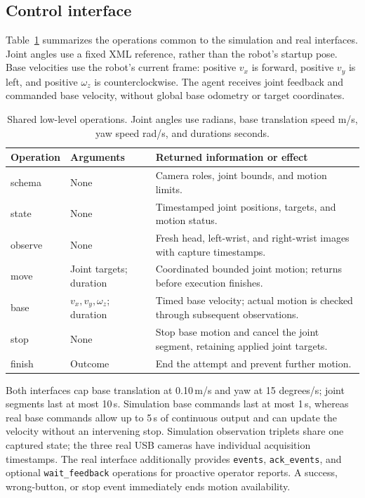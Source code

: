 \documentclass[11pt]{article}
\begin{document}
\subsection{Control interface}
Table~\ref{tab:api} summarizes the operations common to the simulation and real interfaces. Joint angles use a fixed XML reference, rather than the robot's startup pose. Base velocities use the robot's current frame: positive $v_x$ is forward, positive $v_y$ is left, and positive $\omega_z$ is counterclockwise. The agent receives joint feedback and commanded base velocity, without global base odometry or target coordinates.

\begin{table}[H]\centering\small
\begin{tabular}{@{}>{\ttfamily}p{1.6cm}>{\raggedright\arraybackslash}p{3.6cm}>{\raggedright\arraybackslash}p{9.0cm}@{}}
\toprule
\normalfont Operation & Arguments & Returned information or effect\\\midrule
schema & None & Camera roles, joint bounds, and motion limits.\\
state & None & Timestamped joint positions, targets, and motion status.\\
observe & None & Fresh head, left-wrist, and right-wrist images with capture timestamps.\\
move & Joint targets; duration & Coordinated bounded joint motion; returns before execution finishes.\\
base & $v_x,v_y,\omega_z$; duration & Timed base velocity; actual motion is checked through subsequent observations.\\
stop & None & Stop base motion and cancel the joint segment, retaining applied joint targets.\\
finish & Outcome & End the attempt and prevent further motion.\\\bottomrule
\end{tabular}
\caption{Shared low-level operations. Joint angles use radians, base translation speed m/s, yaw speed rad/s, and durations seconds.}\label{tab:api}
\end{table}

Both interfaces cap base translation at 0.10\,m/s and yaw at 15 degrees/s; joint segments last at most 10\,s. Simulation base commands last at most 1\,s, whereas real base commands allow up to 5\,s of continuous output and can update the velocity without an intervening stop. Simulation observation triplets share one captured state; the three real USB cameras have individual acquisition timestamps. The real interface additionally provides \texttt{events}, \texttt{ack\_events}, and optional \texttt{wait\_feedback} operations for proactive operator reports. A success, wrong-button, or stop event immediately ends motion availability.
\end{document}
